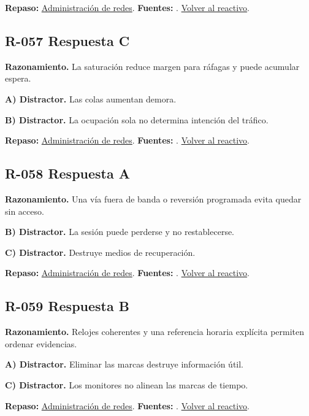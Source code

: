 \textbf{Repaso:} \hyperref[sec:r2]{Administración de redes}. \textbf{Fuentes:} \cite{rfc2131,rfc1034,rfc9293,networks}. \hyperref[q:R-056]{Volver al reactivo}.\par\medskip

\subsection*{R-057 \quad Respuesta C}\label{s:R-057}
\textbf{Razonamiento.} La saturación reduce margen para ráfagas y puede acumular espera.

\textbf{A) Distractor. }Las colas aumentan demora.

\textbf{B) Distractor. }La ocupación sola no determina intención del tráfico.

\textbf{Repaso:} \hyperref[sec:r2]{Administración de redes}. \textbf{Fuentes:} \cite{rfc2131,rfc1034,rfc9293,networks}. \hyperref[q:R-057]{Volver al reactivo}.\par\medskip

\subsection*{R-058 \quad Respuesta A}\label{s:R-058}
\textbf{Razonamiento.} Una vía fuera de banda o reversión programada evita quedar sin acceso.

\textbf{B) Distractor. }La sesión puede perderse y no restablecerse.

\textbf{C) Distractor. }Destruye medios de recuperación.

\textbf{Repaso:} \hyperref[sec:r2]{Administración de redes}. \textbf{Fuentes:} \cite{rfc2131,rfc1034,rfc9293,networks}. \hyperref[q:R-058]{Volver al reactivo}.\par\medskip

\subsection*{R-059 \quad Respuesta B}\label{s:R-059}
\textbf{Razonamiento.} Relojes coherentes y una referencia horaria explícita permiten ordenar evidencias.

\textbf{A) Distractor. }Eliminar las marcas destruye información útil.

\textbf{C) Distractor. }Los monitores no alinean las marcas de tiempo.

\textbf{Repaso:} \hyperref[sec:r2]{Administración de redes}. \textbf{Fuentes:} \cite{rfc2131,rfc1034,rfc9293,networks}. \hyperref[q:R-059]{Volver al reactivo}.\par\medskip


